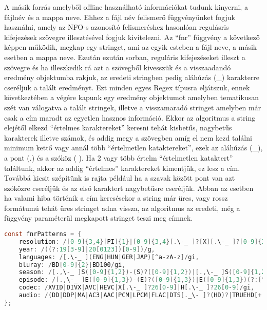 A másik forrás amelyből offline használható információkat tudunk kinyerni, a fájlnév és a mappa neve. Ehhez a fájl név felismerő függvényünket fogjuk használni, amely az NFO-s azonosító felismeréshez hasonlóan regulásris kifejezések szövegre illesztésével fogjuk kivitelezni.
Az ``fnr'' függvény a következő képpen működik, megkap egy stringet, ami az egyik esteben a fájl neve, a másik esetben a mappa neve. Ezután ezután sorban, reguláris kifejezéseket illeszt a szövegre és ha illeszkedik rá azt a szövegből kivesszük és a visszaadandó eredmény objektumba rakjuk, az eredeti stringben pedig aláhúzás (\_) karakterre cseréljük a talált eredményt. Ezt minden egyes Regex típusra eljátszuk, ennek következtében a végére kapunk egy eredmény objektumot amelyben tematikusan szét van válogatva a talált stringek, illetve a visszamaradó stringet amelyben már csak a cím maradt az egyetlen hasznos információ. Ekkor az algoritmus a string elejétől elkezd ``értelmes karaktereket'' keresni tehát kisbetűs, nagybetűs karakterek illetve számok, és addig megy a szövegben amíg el nem kezd találni minimum kettő vagy annál több ``értelmetlen kataktereket'', ezek az aláhúzás (\_), a pont (.) és a szóköz ( ). Ha 2 vagy több értelm ``értelmetlen kataktert'' találtunk, akkor az addig ``értelmes'' karaktereket kimentjük, ez lesz a cím. Továbbá kicsit szépítünk is rajta például ha a szavak között pont van azt szóközre cseréljük és az első karaktert nagybetűsre cseréljük. Abban az esetben ha valami hiba történik a cím keresésekor a string már üres, vagy rossz formátumú tehát üres stringet adna vissza, az algoritmus az eredeti, még a függvény paraméterül megkapott stringet teszi meg címnek.

\begin{lstlisting}[language={c}]
const fnrPatterns = {
    resolution: /[0-9]{3,4}[PI]{1}|[0-9]{3,4}[.\-_ ]?[X][.\-_ ]?[0-9]{3,4}/gi,
    year: /((?:19[3-9]|20[0123])[0-9])/g,
    languages: /[.\-_ ](ENG|HUN|GER|JAP)[^a-zA-z]/gi,
    bluray: /BD[0-9]{2}|BD100/gi,
    season: /[.,\-_ ]S([0-9]{1,2})-(S)?([0-9]{1,2})|[.,\-_ ]S([0-9]{1,2})|[^0-9]([0-9]{1,2})X/gi,
    episode: /[.,\-_ ]E([0-9]{1,3})-(E)?([0-9]{1,3})|E([0-9]{1,3})(?:[^0-9]|$)|[Xx]([0-9]{1,3})(?:[^0-9]|$)|(EP|EPISODE)([0-9]{1,3})(?:[^0-9]|$)/gi,
    codec: /XVID|DIVX|AVC|HEVC|X[.\-_ ]?26[0-9]|H[.\-_ ]?26[0-9]/gi,
    audio: /(DD|DDP|MA|AC3|AAC|PCM|LPCM|FLAC|DTS[._\- ]?(HD)?|TRUEHD[+._\- ]?ATMOS|TRUEHD|ATMOS)[+._\- ]?[0-9]\.?[0-9]|DTS[._\- ]?(HD|ES)?|DUAL[._\- ]?AUDIO|DOLBY[+._\- ]?(DIGITAL[+._\- ]?(PLUS)?|VISION|ATMOS)|HALF-OU/gi,
};
\end{lstlisting}

